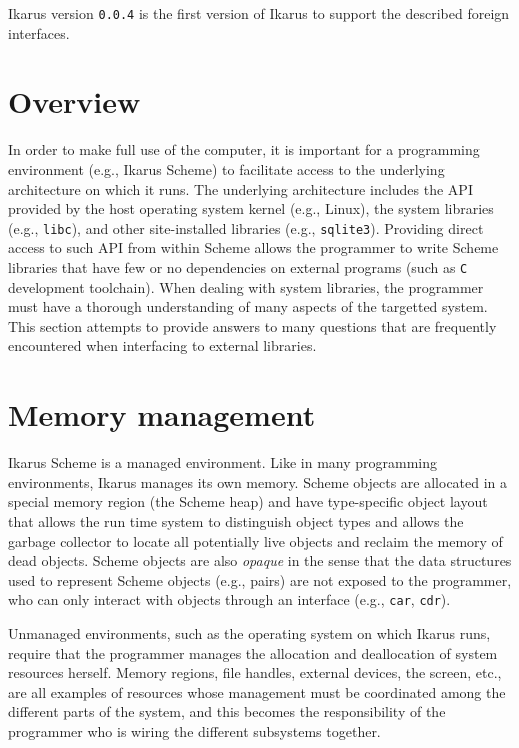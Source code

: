 \documentclass[onecolumn, 12pt, twoside, openright, dvipdfm]{book}
\begin{document}
Ikarus version \texttt{0.0.4} is the first version of Ikarus to
support the described foreign interfaces.
\newpage

\section{\label{sec:ffi-overview}Overview}

In order to make full use of the computer, it is important for a
programming environment (e.g., Ikarus Scheme) to facilitate access
to the underlying architecture on which it runs.  The underlying
architecture includes the API provided by the host operating system
kernel (e.g., Linux), the system libraries (e.g., \texttt{libc}),
and other site-installed libraries (e.g., \texttt{sqlite3}).
Providing direct access to such API from within Scheme allows the
programmer to write Scheme libraries that have few or no
dependencies on external programs (such as \texttt{C} development
toolchain).  When dealing with system libraries, the programmer
must have a thorough understanding of many aspects of the targetted 
system.  This section attempts to provide answers to many questions
that are frequently encountered when interfacing to external
libraries.


\section{Memory management}

Ikarus Scheme is a managed environment.  Like in many programming
environments, Ikarus manages its own memory.  Scheme objects are
allocated in a special memory region (the Scheme heap) and have
type-specific object layout that allows the run time system to
distinguish object types and allows the garbage collector to locate
all potentially live objects and reclaim the memory of dead objects.
Scheme objects are also \emph{opaque} in the sense that the data
structures used to represent Scheme objects (e.g., pairs) are not
exposed to the programmer, who can only interact with objects
through an interface (e.g., \texttt{car}, \texttt{cdr}).  

Unmanaged environments, such as the operating system on which Ikarus
runs, require that the programmer manages the allocation and
deallocation of system resources herself.  Memory regions, file
handles, external devices, the screen, etc., are all examples of
resources whose management must be coordinated among the different
parts of the system, and this becomes the responsibility of the
programmer who is wiring the different subsystems together.
\end{document}
